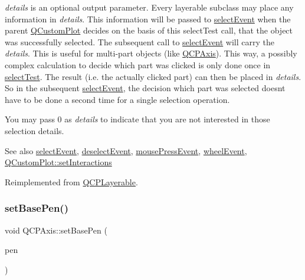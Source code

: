 {\itshape details} is an optional output parameter. Every layerable subclass may place any information in {\itshape details}. This information will be passed to \mbox{\hyperlink{class_q_c_p_axis_a50c3ed18e189d48421ec2978f88e4f87}{select\+Event}} when the parent \mbox{\hyperlink{class_q_custom_plot}{Q\+Custom\+Plot}} decides on the basis of this select\+Test call, that the object was successfully selected. The subsequent call to \mbox{\hyperlink{class_q_c_p_axis_a50c3ed18e189d48421ec2978f88e4f87}{select\+Event}} will carry the {\itshape details}. This is useful for multi-\/part objects (like \mbox{\hyperlink{class_q_c_p_axis}{Q\+C\+P\+Axis}}). This way, a possibly complex calculation to decide which part was clicked is only done once in \mbox{\hyperlink{class_q_c_p_axis_a63b7103c57fe9acfbce164334ea837f8}{select\+Test}}. The result (i.\+e. the actually clicked part) can then be placed in {\itshape details}. So in the subsequent \mbox{\hyperlink{class_q_c_p_axis_a50c3ed18e189d48421ec2978f88e4f87}{select\+Event}}, the decision which part was selected doesn\textquotesingle{}t have to be done a second time for a single selection operation.

You may pass 0 as {\itshape details} to indicate that you are not interested in those selection details.

\begin{DoxySeeAlso}{See also}
\mbox{\hyperlink{class_q_c_p_axis_a50c3ed18e189d48421ec2978f88e4f87}{select\+Event}}, \mbox{\hyperlink{class_q_c_p_axis_a5bc1f8a8d0fbc7658eba70c80279ed31}{deselect\+Event}}, \mbox{\hyperlink{class_q_c_p_axis_a61bc07cda6193a3fa6b5aa198fc4e4fa}{mouse\+Press\+Event}}, \mbox{\hyperlink{class_q_c_p_axis_aa850f195d7cc470c53809d0fff5e444d}{wheel\+Event}}, \mbox{\hyperlink{class_q_custom_plot_a5ee1e2f6ae27419deca53e75907c27e5}{Q\+Custom\+Plot\+::set\+Interactions}} 
\end{DoxySeeAlso}


Reimplemented from \mbox{\hyperlink{class_q_c_p_layerable_a04db8351fefd44cfdb77958e75c6288e}{Q\+C\+P\+Layerable}}.

\mbox{\label{class_q_c_p_axis_a778d45fb71b3c7ab3bb7079e18b058e4}} 
\subsubsection{\texorpdfstring{setBasePen()}{setBasePen()}}
{\footnotesize\ttfamily void Q\+C\+P\+Axis\+::set\+Base\+Pen (\begin{DoxyParamCaption}\item[{const Q\+Pen \&}]{pen }\end{DoxyParamCaption})}

